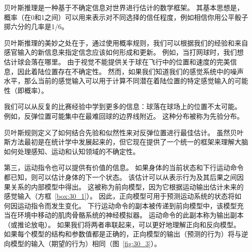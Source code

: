 \begin{proposition}[贝叶斯推断] \label{box:30_2}
	
	\quad \quad 贝叶斯推理是一种基于不确定信息对世界进行估计的数学框架。
	其基本思想是，概率（在0和1之间）可以用来表示对不同选择的信任程度，例如相信你用公平骰子掷六分的几率是1/6。
	
	\quad \quad 贝叶斯推理的美妙之处在于，通过使用概率规则，我们可以根据我们的经验和来自感官输入的新信息来指定信念应该如何形成和更新。
	例如，当打网球时，我们想估计球会落在哪里。
	由于视觉不能提供关于球在飞行中的位置和速度的完美信息，因此着陆位置存在不确定性。
	然而，如果我们知道我们的感觉系统中的噪声水平，那么当前的感觉输入可以用于计算不同潜在着陆位置的特定感觉输入的可能性（即概率）。
	
	\quad \quad 我们可以从反复的比赛经验中学到更多的信息：球落在球场上的位置不太可能。
	例如，反弹位置可能集中在最难回球的边界线附近。
	这种分布被称为先验分布。
	
	\quad \quad 贝叶斯规则定义了如何结合先验和似然性来对反弹位置进行最佳估计。
	虽然贝叶斯方法最初是在统计学中发展起来的，但它现在提供了一个统一的框架来理解大脑如何处理感知、运动和认知领域的不确定性。
	
\end{proposition}


第三，运动指令也可以提供有价值的信息。
如果身体的当前状态和下行运动命令都已知，则可以估计身体的下一个状态。
该估计可以从表示行为及其后果之间因果关系的内部模型中得出。
这被称为前向模型，因为它根据运动输出估计未来的感觉输入（方框~\ref{box:30_1}）。
因此，正向模型可用于预测运动系统的状态将如何因运动指令而发生变化。
下行运动命令的副本被传递到前向模型中，该模型充当在环境中移动的肌肉骨骼系统的神经模拟器。
运动命令的此副本称为输出副本（或推论放电）。
如果我们将两者串联起来，可以更好地理解正向和反向模型。
如果每个模型的结构和参数值都是正确的，正向模型的输出（预测的行为）将与逆向模型的输入（期望的行为）相同（图~\ref{fig:30_3}）。


